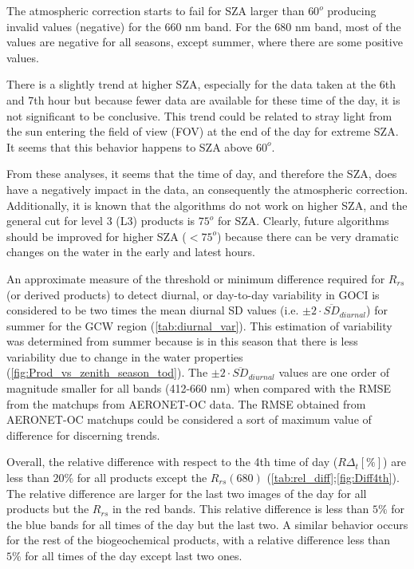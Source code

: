 \documentclass[onecolumn,3p,letterpaper,11pt]{elsarticle}
\begin{document}
The atmospheric correction starts to fail for SZA larger than $60^o$ producing invalid values (negative) for the 660 nm band.
For the 680 nm band, most of the values are negative for all seasons, except summer, where there are some positive values.

There is a slightly trend at higher SZA, especially for the data taken at the 6th and 7th hour but because fewer data are available for these time of the day, it is not significant to be conclusive. 
This trend could be related to stray light from the sun entering the field of view (FOV) at the end of the day for extreme SZA. 
It seems that this behavior happens to SZA above $60^o$. 

From these analyses, it seems that the time of day, and therefore the SZA, does have a negatively impact in the data, an consequently the atmospheric correction. 
Additionally, it is known that the algorithms do not work on higher SZA, and the general cut for level 3 (L3) products is $75^o$ for SZA. 
Clearly, future algorithms should be improved for higher SZA ($<75^o$) because there can be very dramatic changes on the water in the early and latest hours.

An approximate measure of the threshold or minimum difference required for $R_{rs}$ (or derived products) to detect diurnal, or day-to-day variability in GOCI is considered to be two times the mean diurnal SD values (i.e. $\pm2\cdot \overline{SD}_{diurnal}$) for summer for the GCW region (\autoref{tab:diurnal_var}).
This estimation of variability was determined from summer because is in this season that there is less variability due to change in the water properties (\autoref{fig:Prod_vs_zenith_season_tod}).
The $\pm2\cdot \overline{SD}_{diurnal}$ values are one order of magnitude smaller for all bands (412-660 nm) when compared with the RMSE from the matchups from AERONET-OC data.
The RMSE obtained from AERONET-OC matchups could be considered a sort of maximum value of difference for discerning trends.

Overall, the relative difference with respect to the 4th time of day ($R\Delta_t[\%]$) are less than $20\%$ for all products except the $R_{rs}(680)$ (\autoref{tab:rel_diff};\autoref{fig:Diff4th}). 
The relative difference are larger for the last two images of the day for all products but the $R_{rs}$ in the red bands. 
This relative difference is less than $5\%$ for the blue bands for all times of the day but the last two. 
A similar behavior occurs for the rest of the biogeochemical products, with a relative difference less than $5\%$ for all times of the day except last two ones. 
\end{document}
